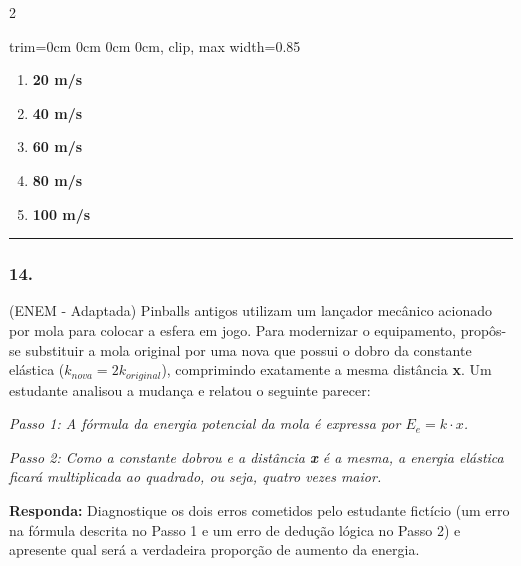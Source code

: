 \documentclass[twoside, 10pt, a4paper]{article}
\newlength{\espacoPreQuestao}\setlength{\espacoPreQuestao}{0.1cm}
\newlength{\espacoQuestao}\setlength{\espacoQuestao}{0.2cm}
\newlength{\espacoAlt}\setlength{\espacoAlt}{0.2cm}
\newcommand{\larguraTikz}{0.85\linewidth}
\begin{document}
\begin{multicols*}{2}
\begin{center}
\begin{adjustbox}{trim=0cm 0cm 0cm 0cm, clip, max width=\larguraTikz}
\end{adjustbox}
\end{center}
\begin{enumerate}[label=\alph*), itemsep=\espacoAlt]
    \item \textbf{20 m/s}
    \item \textbf{40 m/s}
    \item \textbf{60 m/s}
    \item \textbf{80 m/s}
    \item \textbf{100 m/s}
\end{enumerate}
\par\vspace{\espacoQuestao}

\noindent\textcolor{CorLinha}{\rule{\linewidth}{0.5pt}}
\par\vspace{\espacoPreQuestao}
\subsubsection*{14.} (ENEM - Adaptada) Pinballs antigos utilizam um lançador mecânico acionado por mola para colocar a esfera em jogo. Para modernizar o equipamento, propôs-se substituir a mola original por uma nova que possui o dobro da constante elástica ($ k_{nova} = 2k_{original} $), comprimindo exatamente a mesma distância \textbf{x}. Um estudante analisou a mudança e relatou o seguinte parecer:

\textit{Passo 1: A fórmula da energia potencial da mola é expressa por $ E_e = k \cdot x $.}

\textit{Passo 2: Como a constante dobrou e a distância \textbf{x} é a mesma, a energia elástica ficará multiplicada ao quadrado, ou seja, quatro vezes maior.}
\begin{boxresponda}
\textbf{Responda:} Diagnostique os dois erros cometidos pelo estudante fictício (um erro na fórmula descrita no Passo 1 e um erro de dedução lógica no Passo 2) e apresente qual será a verdadeira proporção de aumento da energia.
\end{boxresponda}
\par\vspace{\espacoQuestao}



\end{multicols*}
\end{document}
